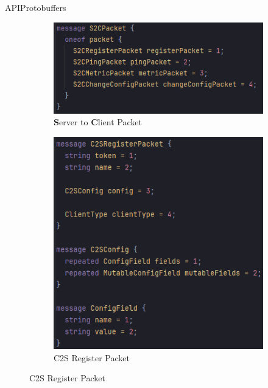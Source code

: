 \documentclass{beamer}
\begin{document}
\begin{frame}{API}{Protobuffers}
\begin{figure}
\begin{subfigure}[h]{0.45\linewidth}
\includegraphics[width=\linewidth]{code_snippet_3.png}
\caption{{\bf S}erver to {\bf C}lient Packet}
\end{subfigure}
\begin{subfigure}[h]{0.45\linewidth}
\includegraphics[width=\linewidth]{code_snippet_4.png}
\caption{C2S Register Packet}
\end{subfigure}
\end{figure}
\end{frame}
\end{document}
